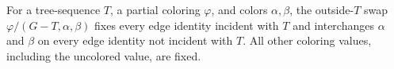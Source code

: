 \begin{definition}
For a tree-sequence $T$, a partial coloring $\varphi$, and colors
$\alpha,\beta$, the outside-$T$ swap
$\varphi/(G-T,\alpha,\beta)$ fixes every edge identity incident with $T$
and interchanges $\alpha$ and $\beta$ on every edge identity not incident
with $T$.  All other coloring values, including the uncolored value, are
fixed.
\end{definition}
